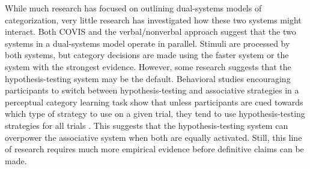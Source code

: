 \documentclass[../dissertation.tex]{subfiles}
\begin{document}
While much research has focused on outlining dual-systems models of categorization, very little research has investigated how these two systems might interact. Both  COVIS and the verbal/nonverbal approach suggest that the two systems in a dual-systems model operate in parallel. Stimuli are processed by both systems, but category decisions are made using the faster system or the system with the strongest evidence. However, some research suggests that the hypothesis-testing system may be the default. Behavioral studies encouraging participants to switch between hypothesis-testing and associative strategies in a perceptual category learning task show that unless participants are cued towards which type of strategy to use on a given trial, they tend to use hypothesis-testing strategies for all trials \citep{Ashby2010, Erickson2008}. This suggests that the hypothesis-testing system can overpower the associative system when both are equally activated. Still, this line of research requires much more empirical evidence before definitive claims can be made.
\end{document}
